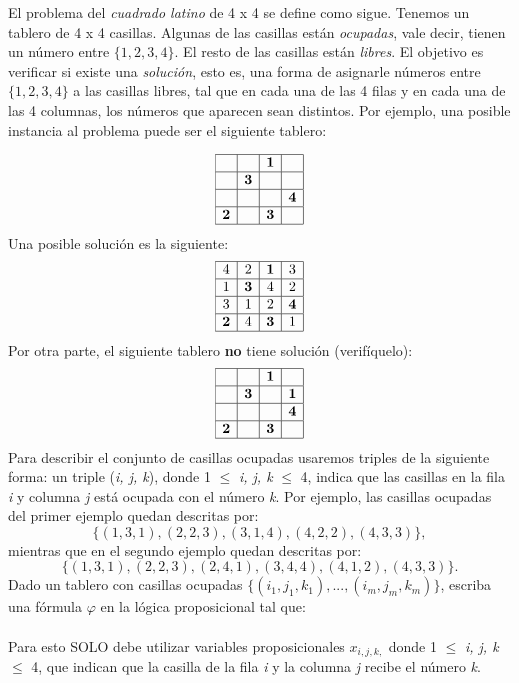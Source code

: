 \documentclass[12pt]{article}
\begin{document}
El problema del \textit{cuadrado latino} de 4 x 4 se define como sigue. Tenemos un 
tablero de 4 x 4 casillas. Algunas de las casillas están \textit{ocupadas}, vale decir, tienen un
número entre $\{1, 2, 3, 4\}$. El resto de las casillas están \textit{libres}. El objetivo es verificar
si existe una \textit{solución}, esto es, una forma de asignarle números entre $\{1, 2, 3, 4\}$ a las
casillas libres, tal que en cada una de las 4 filas y en cada una de las 4 columnas, los números 
que aparecen sean distintos. Por ejemplo, una posible instancia al problema puede ser el siguiente tablero:

\[
\begin{array}{|c|c|c|c|} \hline
 &  & \textbf{1} &  \\ \hline
 & \textbf{3} &  &  \\ \hline
 &  &  & \textbf{4} \\ \hline
\textbf{2} &  & \textbf{3} &  \\ \hline
\end{array}
\]
Una posible solución es la siguiente:
\[
\begin{array}{|c|c|c|c|} \hline
4 & 2 & \textbf{1} & 3 \\ \hline
1 & \textbf{3} & 4 & 2 \\ \hline
3 & 1 & 2 & \textbf{4} \\ \hline
\textbf{2} & 4 & \textbf{3} & 1 \\ \hline
\end{array}
\]
Por otra parte, el siguiente tablero \textbf{no} tiene solución (verifíquelo):
\[
\begin{array}{|c|c|c|c|} \hline
 &  & \textbf{1} &  \\ \hline
 & \textbf{3} &  & \textbf{1} \\ \hline
 &  &  & \textbf{4} \\ \hline
\textbf{2} &  & \textbf{3} &  \\ \hline
\end{array}
\]
Para describir el conjunto de casillas ocupadas usaremos triples de la siguiente forma: un triple
(\textit{i, j, k}), donde 1 $\leq$ \textit{i, j, k} $\leq$ 4, indica que las casillas en la fila \textit{i}
y columna \textit{j} está ocupada con el número \textit{k}. Por ejemplo, las casillas ocupadas del primer
ejemplo quedan descritas por:
\[\{(1, 3, 1), (2, 2, 3), (3, 1, 4), (4, 2, 2), (4, 3, 3)\},\]
mientras que en el segundo ejemplo quedan descritas por:
\[\{(1, 3, 1), (2, 2, 3), (2, 4, 1), (3, 4, 4), (4, 1, 2), (4, 3, 3)\}.\]
Dado un tablero con casillas ocupadas $\{(i_1, j_1, k_1),..., (i_m, j_m, k_m)\}$, escriba una fórmula
$\varphi$ en la lógica proposicional tal que:\\
\\
Para esto SOLO debe utilizar variables proposicionales $x_{i,j,k,}$ donde 1 $\leq$ \textit{i, j, k} $\leq$ 4, que
indican que la casilla de la fila \textit{i} y la columna \textit{j} recibe el número \textit{k}.
\end{document}
